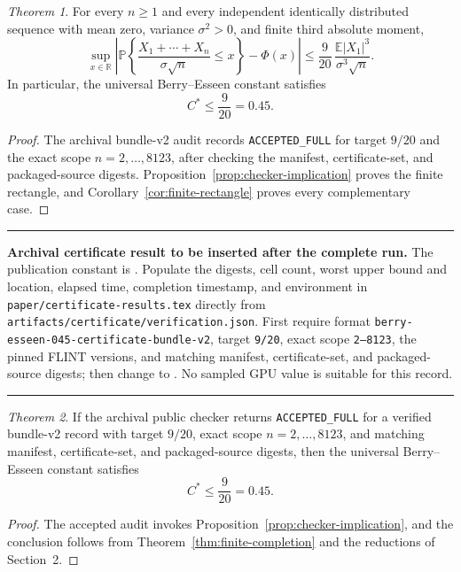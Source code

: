 \documentclass[11pt,a4paper,twoside]{article}
\theoremstyle{remark}
\newtheorem*{finaltheorem}{Theorem}
\newcommand{\R}{\mathbb{R}}
\newcommand{\E}{\mathbb{E}}
\newcommand{\Prob}{\mathbb{P}}
\newcommand{\abs}[1]{\lvert#1\rvert}
\newcommand{\Cstar}{C^{\ast}}
\newcommand{\code}[1]{\texttt{#1}}
\newenvironment{resultbox}
  {\par\medskip\noindent
   \begin{minipage}{\dimexpr\linewidth-2\fboxsep-2\fboxrule\relax}
   \raggedright\color{BerryBlue}\hrule\medskip\color{black}}
  {\medskip\color{BerryBlue}\hrule\color{black}
   \end{minipage}\par\medskip}
\begin{document}
\begin{finaltheorem}
For every \(n\ge1\) and every independent identically distributed sequence
with mean zero, variance \(\sigma^2>0\), and finite third absolute moment,
\[
 \sup_{x\in\R}
 \left|
 \Prob\!\left\{
 \frac{X_1+\cdots+X_n}{\sigma\sqrt n}\le x
 \right\}
 -\Phi(x)
 \right|
 \le
 \frac9{20}\,
 \frac{\E\abs{X_1}^3}{\sigma^3\sqrt n}.
\]
In particular, the universal Berry--Esseen constant satisfies
\[
 \boxed{\Cstar\le\frac9{20}=0.45}.
\]
\end{finaltheorem}

\begin{proof}
The archival bundle-v2 audit records \code{ACCEPTED\_FULL} for target
\(9/20\) and the exact scope \(n=2,\ldots,8123\), after checking the manifest,
certificate-set, and packaged-source digests.  Proposition~\ref{prop:checker-implication}
proves the finite rectangle, and Corollary~\ref{cor:finite-rectangle} proves
every complementary case.
\end{proof}
\else
\begin{resultbox}
\textbf{Archival certificate result to be inserted after the complete run.}
The publication constant is \CertifiedConstant.  Populate the digests, cell
count, worst upper bound and location, elapsed time, completion timestamp, and
environment in
\code{paper/certificate-results.tex} directly from
\code{artifacts/certificate/verification.json}.  First require format
\code{berry-esseen-045-certificate-bundle-v2}, target \code{9/20}, exact scope
\code{2--8123}, the pinned FLINT versions, and matching manifest,
certificate-set, and packaged-source digests; then change
\code{\string\certificateacceptedfalse} to
\code{\string\certificateacceptedtrue}.  No sampled GPU value is suitable
for this record.
\end{resultbox}

\begin{finaltheorem}
If the archival public checker returns \code{ACCEPTED\_FULL} for a verified
bundle-v2 record with target \(9/20\), exact scope \(n=2,\ldots,8123\), and
matching manifest, certificate-set, and packaged-source digests, then the
universal Berry--Esseen constant satisfies
\[
 \boxed{\Cstar\le\frac9{20}=0.45}.
\]
\end{finaltheorem}

\begin{proof}
The accepted audit invokes Proposition~\ref{prop:checker-implication}, and
the conclusion follows from Theorem~\ref{thm:finite-completion} and the
reductions of Section~2.
\end{proof}
\fi
\end{document}
